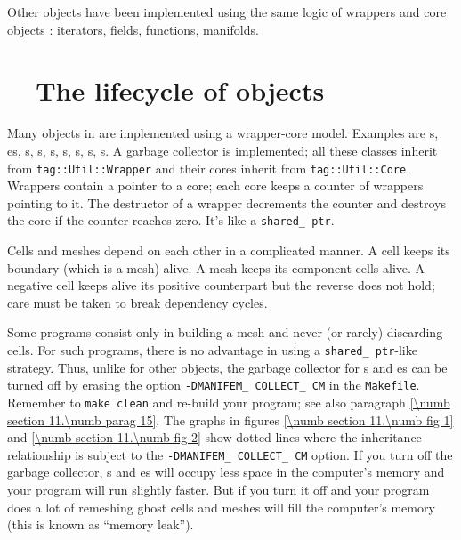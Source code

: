 Other objects have been implemented using the same logic of wrappers and core objects :
iterators, fields, functions, manifolds.


\section{~~The lifecycle of objects}\label{\numb section 11.\numb parag 5}

Many objects in {\maniFEM} are implemented using a wrapper-core model.
Examples are {\small\tt{}}s, {\small\tt{}}es,
{\small\tt{}}s, {\small\tt{}}s, {\small\tt{}}s,
{\small\tt{}}s, {\small\tt{}}s, {\small\tt{}}s,%
s.
A garbage collector is implemented; all these classes inherit from
{\small\tt \textcolor{tag}{tag}::Util::Wrapper} and
their cores inherit from {\small\tt \textcolor{tag}{tag}::Util::Core}.
Wrappers contain a pointer to a core; each core keeps a counter of wrappers pointing to it.
The destructor of a wrapper decrements the counter and destroys the core if the counter
reaches zero.
It's like a {\small\tt shared\_\,ptr}.

Cells and meshes depend on each other in a complicated manner.
A cell keeps its boundary (which is a mesh) alive.
A mesh keeps its component cells alive.
A negative cell keeps alive its positive counterpart but the reverse does not hold;
care must be taken to break dependency cycles.

Some programs consist only in building a mesh and never (or rarely) discarding cells.
For such programs, there is no advantage in using a {\small\tt shared\_\,ptr}-like strategy.
Thus, unlike for other {\maniFEM} objects, the garbage collector for {\small\tt {}}s and
{\small\tt {}}es can be turned off by erasing the option
{\small\tt -DMANIFEM\_\,COLLECT\_\,CM} in the {\small\tt Makefile}.
Remember to {\small\tt make clean} and re-build your program;
see also paragraph \ref{\numb section 11.\numb parag 15}.
The graphs in figures \ref{\numb section 11.\numb fig 1} and \ref{\numb section 11.\numb fig 2}
show dotted lines where the inheritance relationship is subject to the
{\small\tt -DMANIFEM\_\,COLLECT\_\,CM} option.
If you turn off the garbage collector, {\small\tt {}}s and {\small\tt {}}es
will occupy less space in the computer's memory and your program will run slightly faster.
But if you turn it off and your program does a lot of remeshing
ghost cells and meshes will fill the computer's memory (this is known as ``memory leak'').

